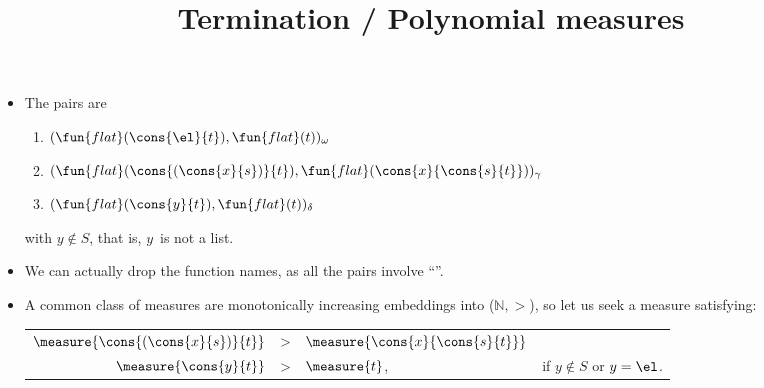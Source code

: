 \documentclass[wide]{slides}
\begin{document}
\begin{slide}
  \title{Termination / Polynomial measures}

  \begin{itemize}

    \item The pairs are
      \begin{enumerate}

        \item \((\fun{flat}(\cons{\el}{t}), \fun{flat}(t))_\omega\)

        \item \((\fun{flat}(\cons{(\cons{x}{s})}{t}),
          \fun{flat}(\cons{x}{\cons{s}{t}}))_\gamma\)

        \item \((\fun{flat}(\cons{y}{t}), \fun{flat}(t))_\delta\)

      \end{enumerate}
      with \(y \not\in S\), that is, \(y\)~is not a list.

    \item We can actually drop the function names, as all the pairs
      involve ``''.

    \item A common class of measures are monotonically increasing
      embeddings into (\(\mathbb{N},>\)), so let us seek a measure
      satisfying:
      \begin{center}
        \begin{tabular}{r@{\;\,}c@{\;}ll}
          \(\measure{\cons{(\cons{x}{s})}{t}}\) & > &
          \(\measure{\cons{x}{\cons{s}{t}}}\)\\
          \(\measure{\cons{y}{t}}\) & > & \(\measure{t}\),
          & if \(y \not\in S\) or \(y=\el\).
        \end{tabular}
      \end{center}

  \end{itemize}

\end{slide}
\end{document}
